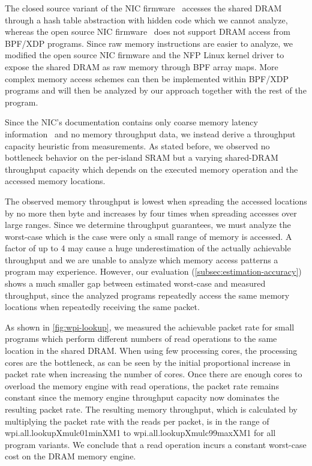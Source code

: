 \documentclass[10pt,letterpaper,sigconf,anonymous,nonacm,screen]{acmart}
\newcommand{\afblock}[1]{\noindent{\textbf{#1.}}}
\newcommand{\mdata}[3]{%
	\csname #1X#2X#3\endcsname%
}
\begin{document}
The closed source variant of the NIC firmware~\cite{bpf-firmware} accesses the shared DRAM through a hash table abstraction with hidden code which we cannot analyze, whereas the open source NIC firmware~\cite{nic-firmware} does not support DRAM access from BPF/XDP programs.
Since raw memory instructions are easier to analyze, we modified the open source NIC firmware and the \ac{NFP} Linux kernel driver to expose the shared DRAM as raw memory through BPF array maps.
More complex memory access schemes can then be implemented within BPF/XDP programs and will then be analyzed by our approach together with the rest of the program.

Since the NIC's documentation contains only coarse memory latency information~\cite{joy-of-micro-c} and no memory throughput data, we instead derive a throughput capacity heuristic from measurements.
As stated before, we observed no bottleneck behavior on the per-island SRAM but a varying shared-DRAM throughput capacity which depends on the executed memory operation and the accessed memory locations.

The observed memory throughput is lowest when spreading the accessed locations by no more then \unit[16]{byte} and increases by four times when spreading accesses over large ranges.
Since we determine throughput guarantees, we must analyze the worst-case which is the case were only a small range of memory is accessed.
A factor of up to 4 may cause a huge underestimation of the actually achievable throughput and we are unable to analyze which memory access patterns a program may experience.
However, our evaluation (\ref{subsec:estimation-accuracy}) shows a much smaller gap between estimated worst-case and measured throughput, since the analyzed programs repeatedly access the same memory locations when repeatedly receiving the same packet.

\afblock{DRAM Throughput Capacity}
As shown in \ref{fig:wpi-lookup}, we measured the achievable packet rate for small programs which perform different numbers of read operations to the same location in the shared DRAM.
When using few processing cores, the processing cores are the bottleneck, as can be seen by the initial proportional increase in packet rate when increasing the number of cores.
Once there are enough cores to overload the memory engine with read operations, the packet rate remains constant since the memory engine throughput capacity now dominates the resulting packet rate.
The resulting memory throughput, which is calculated by multiplying the packet rate with the reads per packet, is in the range of \mdata{wpi.all.lookup}{mulc01min}{M1} to \mdata{wpi.all.lookup}{mulc99max}{M1} for all program variants.
We conclude that a read operation incurs a constant worst-case cost on the DRAM memory engine.
\end{document}
